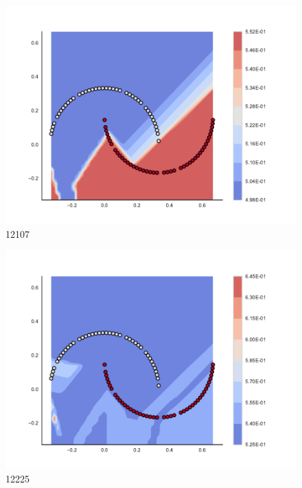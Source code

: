 \begin{subfigure}[b]{0.09\textwidth}
    \includegraphics[width=\textwidth]{img/convergence/12107.pdf}
    \caption{12107}
    \label{fig:convergence_12107}
\end{subfigure}
%
\begin{subfigure}[b]{0.09\textwidth}
    \includegraphics[width=\textwidth]{img/convergence/12225.pdf}
    \caption{12225}
    \label{fig:convergence_12225}
\end{subfigure}
%
